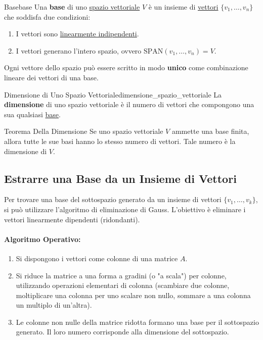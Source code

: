 \documentclass{article}
\begin{document}
\begin{definition}{Base}{base}
    Una \textbf{base} di uno \hyperref[def:spazio_vettoriale]{spazio vettoriale} $V$ è un insieme di \hyperref[def:vettore]{vettori} $\{v_1, \dots, v_n\}$ che soddisfa due condizioni:
    \begin{enumerate}
        \item I vettori sono \hyperref[def:dipendenza_lineare]{linearmente indipendenti}.
        \item I vettori generano l'intero spazio, ovvero $\text{SPAN}(v_1, \dots, v_n) = V$.
    \end{enumerate}
    Ogni vettore dello spazio può essere scritto in modo \textbf{unico} come combinazione lineare dei vettori di una base.
\end{definition}

\begin{definition}{Dimensione di Uno Spazio Vettoriale}{dimensione_spazio_vettoriale}
    La \textbf{dimensione} di uno spazio vettoriale è il numero di vettori che compongono una sua qualsiasi \hyperref[def:base]{base}.
\end{definition}

\begin{theorem}{Teorema Della Dimensione}{}
    Se uno spazio vettoriale $V$ ammette una base finita, allora tutte le sue basi hanno lo stesso numero di vettori.
    Tale numero è la dimensione di $V$.
\end{theorem}

\subsection{Estrarre una Base da un Insieme di Vettori}

Per trovare una base del sottospazio generato da un insieme di vettori $\{v_1, \dots, v_k\}$, si può utilizzare l'algoritmo di eliminazione di Gauss.
L'obiettivo è eliminare i vettori linearmente dipendenti (ridondanti).

\paragraph{Algoritmo Operativo:}
\begin{enumerate}
    \item Si dispongono i vettori come colonne di una matrice $A$.
    \item Si riduce la matrice a una forma a gradini (o "a scala") per colonne, utilizzando operazioni elementari di colonna (scambiare due colonne, moltiplicare una colonna per uno scalare non nullo, sommare a una colonna un multiplo di un'altra).
    \item Le colonne non nulle della matrice ridotta formano una base per il sottospazio generato.
    Il loro numero corrisponde alla dimensione del sottospazio.
\end{enumerate}
\end{document}

